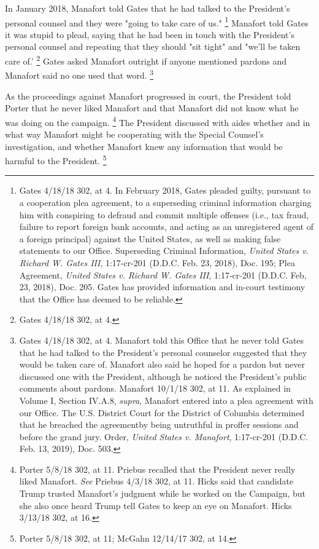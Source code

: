 In January 2018, Manafort told Gates that he had talked to the President's personal counsel and they were "going to take care of us."%
\footnote{Gates 4/18/18 302, at 4.
In February 2018, Gates pleaded guilty, pursuant to a cooperation plea agreement, to a superseding criminal information charging him with conspiring to defraud and commit multiple offenses (i.e., tax fraud, failure to report foreign bank accounts, and acting as an unregistered agent of a foreign principal) against the United States, as well as making false statements to our Office.
Superseding Criminal Information, \textit{United States v. Richard W. Gates III}, 1:17-cr-201 (D.D.C. Feb. 23, 2018), Doc. 195;
Plea Agreement, \textit{United States v. Richard W. Gates III}, 1:17-cr-201 (D.D.C. Feb, 23, 2018), Doc. 205.
Gates has provided information and in-court testimony that the Office has deemed to be reliable.}
Manafort told Gates it was stupid to plead, saying that he had been in touch with the President's personal counsel and repeating that they should "sit tight" and "we'll be taken care of.'%
\footnote{Gates 4/18/18 302, at 4.}
Gates asked Manafort outright if anyone mentioned pardons and Manafort said no one used that word.%
\footnote{Gates 4/18/18 302, at 4.
Manafort told this Office that he never told Gates that he had talked to the President’s personal counselor suggested that they would be taken care of.
Manafort also said he hoped for a pardon but never discussed one with the President, although he noticed the President’s public comments about pardons.
Manafort 10/1/18 302, at 11.
As explained in Volume I, Section IV.A.8, \textit{supra}, Manafort entered into a plea agreement with our Office.
The U.S. District Court for the District of Columbia determined that he breached the agreementby being untruthful in proffer sessions and before the grand jury.
Order, \textit{United States v. Manafort}, 1:17-cr-201 (D.D.C. Feb. 13, 2019), Doc. 503.}

As the proceedings against Manafort progressed in court, the President told Porter that he never liked Manafort and that Manafort did not know what he was doing on the campaign.%
\footnote{Porter 5/8/18 302, at 11.
Priebus recalled that the President never really liked Manafort.
\textit{See} Priebus 4/3/18 302, at 11.
Hicks said that candidate Trump trusted Manafort’s judgment while he worked on the Campaign, but she also once heard Trump tell Gates to keep an eye on Manafort.
Hicks 3/13/18 302, at 16.}
The President discussed with aides whether and in what way Manafort might be cooperating with the Special Counsel's investigation, and whether Manafort knew any information that would be harmful to the President.%
\footnote{Porter 5/8/18 302, at 11;
McGahn 12/14/17 302, at 14.}

